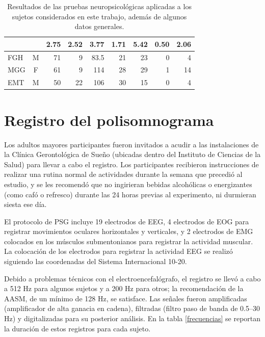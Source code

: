 \documentclass[12pt,a4paper]{mitthesis}
\begin{document}
\begin{table}
\begin{small}
\begin{tabular}{lcrrrrrrr}
\rowcolor{gris}
\multicolumn{1}{c}{$\widehat{\sigma}$} & 
              & 2.75 & 2.52 & 3.77    & 1.71 & 5.42 & 0.50 & 2.06\\
\hline
FGH    & M    & 71   & 9    & 83.5     & 21   & 23   & 0    & 4  \\
MGG    & F    & 61   & 9    & 114      & 28   & 29   & 1    & 14 \\
EMT    & M    & 50   & 22   & 106      & 30   & 15   & 0    & 4  \\
\bottomrule
\end{tabular} 
\end{small}
\label{tab_sujetos}
\caption{Resultados de las pruebas neuropsicol\'ogicas aplicadas a los sujetos considerados en este 
trabajo, adem\'as de algunos datos generales. 
}
\end{table}


\section{Registro del polisomnograma}

Los adultos mayores participantes fueron invitados a acudir a las instalaciones de la Cl\'inica 
Gerontol\'ogica de Sue\~no (ubicadas dentro del Instituto de Ciencias de la Salud) para llevar a 
cabo el registro. Los participantes recibieron instrucciones de realizar una rutina normal de 
actividades durante la semana que precedi\'o al estudio, y se les recomend\'o que no ingirieran 
bebidas alcoh\'olicas o energizantes (como caf\'o o refresco) durante las 24 horas previas al 
experimento, ni durmieran siesta ese d\'ia.

El protocolo de PSG incluye 19 electrodos de EEG, 4 electrodos de EOG para registrar movimientos 
oculares horizontales y verticales, y 2 electrodos de EMG colocados en los m\'usculos 
submentonianos para registrar la actividad muscular. 
La colocaci\'on de los electrodos para registrar la actividad EEG se realiz\'o siguiendo las 
coordenadas del Sistema Internacional 10-20\cite{Coleman87}.

Debido a problemas t\'ecnicos con el electroencefal\'ografo, el registro se llev\'o a cabo a 512 Hz 
para algunos sujetos y a 200 Hz para otros; la recomendaci\'on de la AASM, de un m\'inimo de 128 
Hz, se satisface. 
Las se\~nales fueron amplificadas (amplificador de alta ganacia en cadena), filtradas (filtro paso 
de banda de 0.5--30 Hz) y digitalizadas para su posterior an\'alisis.
En la tabla \ref{frecuencias} se reportan la duraci\'on de estos registros para cada sujeto.
\end{document}
